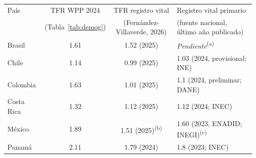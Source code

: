 \begin{tabular}{lccl}
\toprule
País & TFR WPP 2024 & TFR registro vital & Registro vital primario \\
& (Tabla~\ref{tab:demog}) & (Fernández-Villaverde, 2026) & (fuente nacional, último año publicado) \\
\midrule
Brasil & 1.61 & 1.52 (2025) & \textit{Pendiente}\textsuperscript{(a)} \\
Chile & 1.14 & 0.99 (2025) & 1.03 (2024, provisional; INE) \\
Colombia & 1.63 & 1.01 (2025) & 1.1 (2024, preliminar; DANE) \\
Costa Rica & 1.32 & 1.12 (2025) & 1.12 (2024; INEC) \\
México & 1.89 & 1.51 (2025)\textsuperscript{(b)} & 1.60 (2023, ENADID; INEGI)\textsuperscript{(c)} \\
Panamá & 2.11 & 1.79 (2024) & 1.8 (2023; INEC) \\
\bottomrule
\end{tabular}
